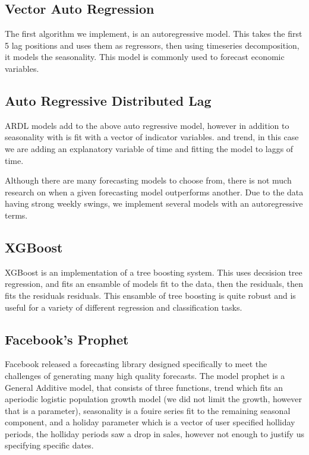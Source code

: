 \documentclass[16pt,twocolumn,letterpaper]{article}
\begin{document}
\subsection{Vector Auto Regression}

The first algorithm we implement, is an autoregressive model. This takes the first 5 lag positions and uses them as regressors, then using timeseries decomposition, it models the seasonality\cite{hamilton1994}. This model is commonly used to forecast economic variables.

\subsection{Auto Regressive Distributed Lag}

ARDL models add to the above auto regressive model, however in addition to seasonality with is fit with a vector of indicator variables. and trend, in this case we are adding an explanatory variable of time and fitting the model to laggs of time.

Although there are many forecasting models to choose from, there is not much research on when a given forecasting model outperforms another. Due to the data having strong weekly swings, we implement several models with an autoregressive terms.


\subsection{XGBoost}

XGBoost is an implementation of a tree boosting system. This uses decsision tree regression, and fits an ensamble of models fit to the data, then the residuals, then fits the residuals residuals. This ensamble of tree boosting is quite robust and is useful for a variety of different regression and classification tasks.

\subsection{Facebook's Prophet}

Facebook released a forecasting library designed specifically to meet the challenges of generating many high quality forecasts. The model prophet is a General Additive model, that consists of three functions, trend which fits an aperiodic logistic population growth model (we did not limit the growth, however that is a parameter), seasonality is a fouire series fit to the remaining seasonal component, and a holiday parameter which is a vector of user specified holliday periods, the holliday periods saw a drop in sales, however not enough to justify us specifying specific dates. 
\end{document}
